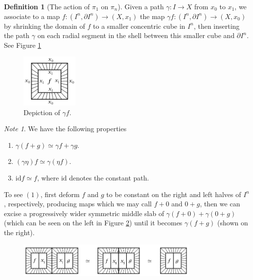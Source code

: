 \documentclass[reqno]{amsart}
\theoremstyle{definition}
\newtheorem{definition}[theorem]{Definition}
\theoremstyle{remark}
\newtheorem*{note}{Note}
\newcommand{\id}{{\mathrm{id}}}
\begin{document}
  \begin{definition}[The action of $\pi_1$ on $\pi_n$]
      Given a path
      $\gamma \colon I \to X$ from
      $x_0$ to $x_1$, we associate to a map
      $f \colon \left( I^{n}, \partial I^{n} \right) \to 
      \left( X, x_1 \right) $ the map
      $\gamma f \colon \left( I^{n}, \partial I^{n} \right) 
      \to \left( X,x_0 \right) $ by shrinking the domain
      of $f$ to a smaller concentric cube in $I^{n}$, then
      inserting the path $\gamma$ on each radial segment
      in the shell between this smaller cube and $\partial
      I^{n}$.
      See Figure \ref{fig:JDWIXHHX011SJ-png}

      \begin{figure}[htpb]
          \centering
          \includegraphics[width=0.25\textwidth]{Figures/JDWIXHHX011SJ.png}
          \caption{Depiction of $\gamma f$.}
          \label{fig:JDWIXHHX011SJ-png}
      \end{figure}

  \begin{note}
      We have the following properties
      \begin{enumerate}
          \item $\gamma \left( f+ g \right) 
              \simeq \gamma f + \gamma g$.
          \item $\left( \gamma \eta \right) f \simeq
              \gamma \left( \eta f \right) $.
          \item $\id f \simeq f$, where
              $\id$ denotes the constant path.
      \end{enumerate}

      To see $(1)$, first deform $f$ and $g$ to be
      constant on the right and left halves of
      $I^{n}$, respectively, producing maps
      which we may call $f+0$ and $0+g$, then we 
      can excise a progressively wider symmetric middle slab
      of $\gamma (f+0) + \gamma(0+g)$ (which can be
      seen on the left in Figure \ref{fig:WIWIWSSK11-png})
      until it becomes $\gamma \left( f+g \right) $ (shown on the
      right).

      \begin{figure}[htpb]
          \centering
          \includegraphics[width=0.8\textwidth]{Figures/WIWIWSSK11.png}
          \caption{}
          \label{fig:WIWIWSSK11-png}
      \end{figure}
  \end{note}


\end{definition}
\end{document}
